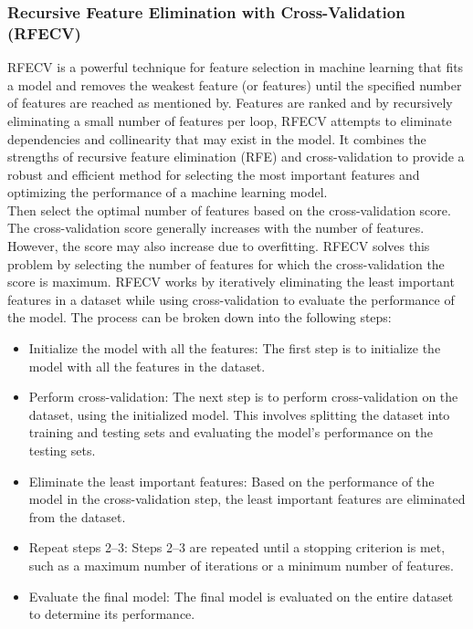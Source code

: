 \documentclass[12pt]{report}
\begin{document}
\subsubsection*{Recursive Feature Elimination with Cross-Validation (RFECV)}
RFECV is a powerful technique for feature selection in machine learning that fits a model and
removes the weakest feature (or features) until the specified number of
features are reached as mentioned by\cite{guyon2002}. Features are ranked and
by recursively eliminating a small number of features per loop, RFECV attempts
to eliminate dependencies and collinearity that may exist in the model. It
combines the strengths of recursive feature elimination (RFE) and
cross-validation to provide a robust and efficient method for selecting the
most important features and optimizing the performance of a machine learning
model.\\

Then select the optimal number of features based on the cross-validation
score. The cross-validation score generally increases with the number of
features. However, the score may also increase due to overfitting. RFECV solves
this problem by selecting the number of features for which the cross-validation
the score is maximum. RFECV works by iteratively eliminating the least important
features in a dataset while using cross-validation to evaluate the performance
of the model. The process can be broken down into the following steps:

\begin{itemize}
      \item Initialize the model with all the features: The first step is to initialize the
            model with all the features in the dataset.
      \item Perform cross-validation: The next step is to perform cross-validation on the
            dataset, using the initialized model. This involves splitting the dataset into
            training and testing sets and evaluating the model's performance on the
            testing sets.
      \item Eliminate the least important features: Based on the performance of the model
            in the cross-validation step, the least important features are eliminated from
            the dataset.
      \item Repeat steps 2--3: Steps 2--3 are repeated until a stopping criterion is met,
            such as a maximum number of iterations or a minimum number of features.
      \item Evaluate the final model: The final model is evaluated on the entire dataset to
            determine its performance.
\end{itemize}
\end{document}
